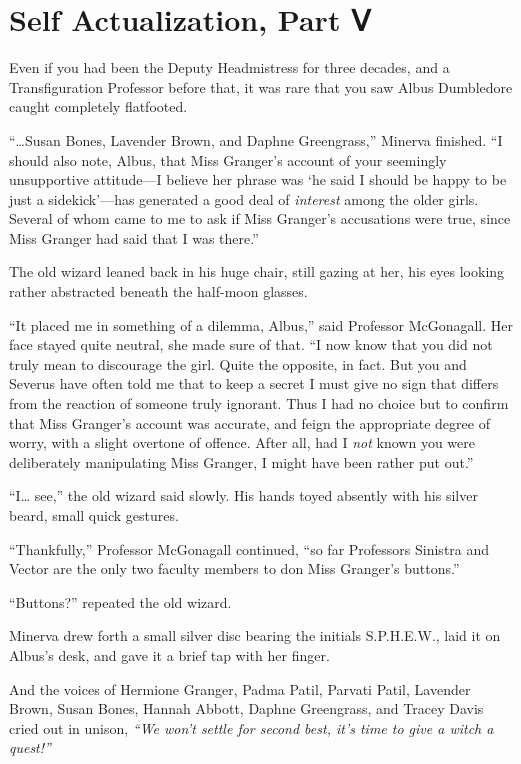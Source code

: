 \chapter{Self Actualization, Part Ⅴ}\label{self-actualization-part}

Even if you had been the Deputy Headmistress for three decades, and a
Transfiguration Professor before that, it was rare that you saw Albus
Dumbledore caught completely flatfooted.

``\ldots{}Susan Bones, Lavender Brown, and Daphne Greengrass,'' Minerva
finished. ``I should also note, Albus, that Miss Granger's account of
your seemingly unsupportive attitude---I believe her phrase was `he said
I should be happy to be just a sidekick'---has generated a good deal of
\emph{interest} among the older girls. Several of whom came to me to ask
if Miss Granger's accusations were true, since Miss Granger had said
that I was there.''

The old wizard leaned back in his huge chair, still gazing at her, his
eyes looking rather abstracted beneath the half-moon glasses.

``It placed me in something of a dilemma, Albus,'' said Professor
McGonagall. Her face stayed quite neutral, she made sure of that. ``I
now know that you did not truly mean to discourage the girl. Quite the
opposite, in fact. But you and Severus have often told me that to keep a
secret I must give no sign that differs from the reaction of someone
truly ignorant. Thus I had no choice but to confirm that Miss Granger's
account was accurate, and feign the appropriate degree of worry, with a
slight overtone of offence. After all, had I \emph{not} known you were
deliberately manipulating Miss Granger, I might have been rather put
out.''

``I\ldots{} see,'' the old wizard said slowly. His hands toyed absently
with his silver beard, small quick gestures.

``Thankfully,'' Professor McGonagall continued, ``so far Professors
Sinistra and Vector are the only two faculty members to don Miss
Granger's buttons.''

``Buttons?'' repeated the old wizard.

Minerva drew forth a small silver disc bearing the initials S.P.H.E.W.,
laid it on Albus's desk, and gave it a brief tap with her finger.

And the voices of Hermione Granger, Padma Patil, Parvati Patil, Lavender
Brown, Susan Bones, Hannah Abbott, Daphne Greengrass, and Tracey Davis
cried out in unison, \emph{``We won't settle for second best, it's time
to give a witch a quest!''}

